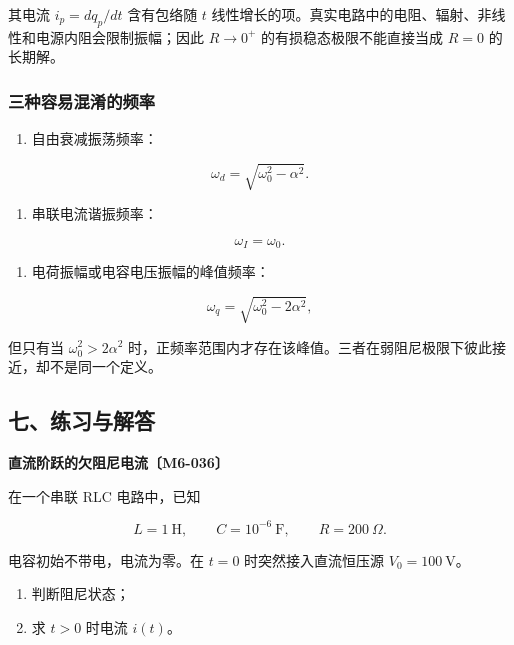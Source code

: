 其电流 \(i_p=dq_p/dt\) 含有包络随 \(t\)
线性增长的项。真实电路中的电阻、辐射、非线性和电源内阻会限制振幅；因此
\(R\to0^+\) 的有损稳态极限不能直接当成 \(R=0\) 的长期解。

\subsubsection{三种容易混淆的频率}\label{m6:ux4e09ux79cdux5bb9ux6613ux6df7ux6dc6ux7684ux9891ux7387}

\begin{enumerate}
\def\labelenumi{\arabic{enumi}.}
\tightlist
\item
  自由衰减振荡频率：
\end{enumerate}

\[
\omega_d=\sqrt{\omega_0^2-\alpha^2}.
\]

\begin{enumerate}
\def\labelenumi{\arabic{enumi}.}
\setcounter{enumi}{1}
\tightlist
\item
  串联电流谐振频率：
\end{enumerate}

\[
\omega_I=\omega_0.
\]

\begin{enumerate}
\def\labelenumi{\arabic{enumi}.}
\setcounter{enumi}{2}
\tightlist
\item
  电荷振幅或电容电压振幅的峰值频率：
\end{enumerate}

\[
\omega_q=\sqrt{\omega_0^2-2\alpha^2},
\tag{57-30}
\]

但只有当 \(\omega_0^2>2\alpha^2\)
时，正频率范围内才存在该峰值。三者在弱阻尼极限下彼此接近，却不是同一个定义。

\subsection{七、练习与解答}\label{m6:ux4e03ux7ec3ux4e60ux4e0eux89e3ux7b54-1}

\par{}
\noindent\begin{minipage}{\linewidth}

\textbf{直流阶跃的欠阻尼电流〔M6-036〕}

在一个串联 RLC 电路中，已知

\[
L=1\ \mathrm H,\qquad C=10^{-6}\ \mathrm F,\qquad R=200\ \Omega.
\]

电容初始不带电，电流为零。在 \(t=0\) 时突然接入直流恒压源
\(V_0=100\ \mathrm V\)。

\begin{enumerate}
\def\labelenumi{\arabic{enumi}.}
\tightlist
\item
  判断阻尼状态；
\item
  求 \(t>0\) 时电流 \(i(t)\)。
\end{enumerate}

\end{minipage}\par

